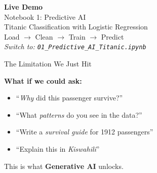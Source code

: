 \documentclass[aspectratio=169,12pt]{beamer}
\begin{document}
\begin{frame}[plain]
\begin{center}
\vspace{2cm}
{\Huge\textcolor{predictblue}{\textbf{Live Demo}}}\\[0.5cm]
{\LARGE Notebook 1: Predictive AI}\\[0.3cm]
{\large Titanic Classification with Logistic Regression}\\[1cm]
{\normalsize Load $\rightarrow$ Clean $\rightarrow$ Train $\rightarrow$ Predict}\\[1.5cm]
\textit{\small Switch to: \texttt{01\_Predictive\_AI\_Titanic.ipynb}}
\end{center}
\end{frame}

\begin{frame}{The Limitation We Just Hit}
\begin{center}
\end{center}
\vspace{0.5cm}
\textbf{What if we could ask:}
\begin{itemize}
\item ``\textit{Why} did this passenger survive?''
\item ``What \textit{patterns} do you see in the data?''
\item ``Write a \textit{survival guide} for 1912 passengers''
\item ``Explain this in \textit{Kiswahili}''
\end{itemize}
\vspace{0.3cm}
\begin{center}
\Large This is what \textcolor{gengreen}{\textbf{Generative AI}} unlocks.
\end{center}
\end{frame}
\end{document}
